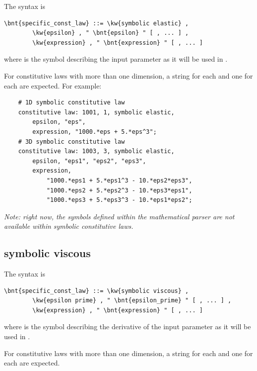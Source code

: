 The syntax is
\begin{Verbatim}[commandchars=\\\{\}]
    \bnt{specific_const_law} ::= \kw{symbolic elastic} ,
        \kw{epsilon} , " \bnt{epsilon} " [ , ... ] ,
        \kw{expression} , " \bnt{expression} " [ , ... ]
\end{Verbatim}
where  is the symbol describing the input
parameter as it will be used in .

For constitutive laws with more than one dimension,
a string for each  and one for each 
are expected.  For example:
\begin{verbatim}
    # 1D symbolic constitutive law
    constitutive law: 1001, 1, symbolic elastic,
        epsilon, "eps",
        expression, "1000.*eps + 5.*eps^3";
    # 3D symbolic constitutive law
    constitutive law: 1003, 3, symbolic elastic,
        epsilon, "eps1", "eps2", "eps3",
        expression,
            "1000.*eps1 + 5.*eps1^3 - 10.*eps2*eps3",
            "1000.*eps2 + 5.*eps2^3 - 10.*eps3*eps1",
            "1000.*eps3 + 5.*eps3^3 - 10.*eps1*eps2";
\end{verbatim}

\emph{Note: right now, the symbols defined within the mathematical parser
are not available within symbolic constitutive laws.}

\subsection{symbolic viscous}\label{sec:CL:SYMBOLIC-VISCOUS}
The syntax is
\begin{Verbatim}[commandchars=\\\{\}]
    \bnt{specific_const_law} ::= \kw{symbolic viscous} ,
        \kw{epsilon prime} , " \bnt{epsilon_prime} " [ , ... ] ,
        \kw{expression} , " \bnt{expression} " [ , ... ]
\end{Verbatim}
where  is the symbol describing the derivative
of the input parameter as it will be used in .

For constitutive laws with more than one dimension,
a string for each  and one for each 
are expected.


